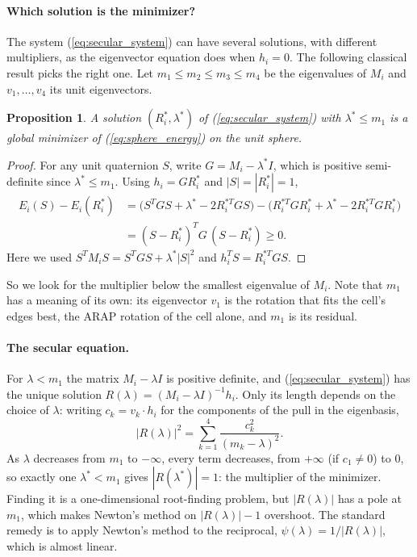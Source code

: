 \documentclass{birkjour}
\newtheorem{prop}[thm]{Proposition}
\theoremstyle{remark}
\numberwithin{equation}{section}
\begin{document}
\paragraph{Which solution is the minimizer?} The system (\ref{eq:secular_system}) can have several solutions, with different multipliers, as the eigenvector equation does when $h_i = 0$. The following classical result \cite{Gander1989, MoreSorensen1983} picks the right one. Let $m_1 \leq m_2 \leq m_3 \leq m_4$ be the eigenvalues of $M_i$ and $v_1, \dots, v_4$ its unit eigenvectors.
\begin{prop}
\label{prop:sphere_minimum}
A solution $(R^*_i, \lambda^*)$ of (\ref{eq:secular_system}) with $\lambda^* \leq m_1$ is a global minimizer of (\ref{eq:sphere_energy}) on the unit sphere.
\end{prop}
\begin{proof}
For any unit quaternion $S$, write $G = M_i - \lambda^* I$, which is positive semi-definite since $\lambda^* \leq m_1$. Using $h_i = G R^*_i$ and $|S| = |R^*_i| = 1$,
\begin{align*}
E_i(S) - E_i(R^*_i) &= \big( S^T G S + \lambda^* - 2 R_i^{*T} G S \big) - \big( R_i^{*T} G R^*_i + \lambda^* - 2 R_i^{*T} G R^*_i \big) \\
&= (S - R^*_i)^T G \, (S - R^*_i) \geq 0 .
\end{align*}
Here we used $S^T M_i S = S^T G S + \lambda^* |S|^2$ and $h_i^T S = R_i^{*T} G S$.
\end{proof}
So we look for the multiplier below the smallest eigenvalue of $M_i$. Note that $m_1$ has a meaning of its own: its eigenvector $v_1$ is the rotation that fits the cell's edges best, the ARAP rotation of the cell alone, and $m_1$ is its residual.

\paragraph{The secular equation.} For $\lambda < m_1$ the matrix $M_i - \lambda I$ is positive definite, and (\ref{eq:secular_system}) has the unique solution $R(\lambda) = (M_i - \lambda I)^{-1} h_i$. Only its length depends on the choice of $\lambda$: writing $c_k = v_k \cdot h_i$ for the components of the pull in the eigenbasis,
\begin{equation*}
|R(\lambda)|^2 = \sum_{k=1}^4 \frac{c_k^2}{(m_k - \lambda)^2} .
\end{equation*}
As $\lambda$ decreases from $m_1$ to $-\infty$, every term decreases, from $+\infty$ (if $c_1 \neq 0$) to $0$, so exactly one $\lambda^* < m_1$ gives $|R(\lambda^*)| = 1$: the multiplier of the minimizer. Finding it is a one-dimensional root-finding problem, but $|R(\lambda)|$ has a pole at $m_1$, which makes Newton's method on $|R(\lambda)| - 1$ overshoot. The standard remedy \cite{MoreSorensen1983} is to apply Newton's method to the reciprocal, $\psi(\lambda) = 1/|R(\lambda)|$, which is almost linear.
\end{document}
